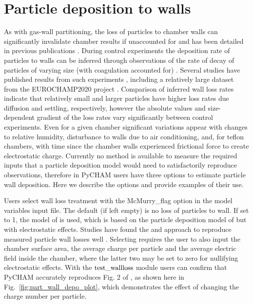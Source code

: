 \documentclass[gmd, manuscript]{copernicus}
\begin{document}
\section{Particle deposition to walls}

As with gas-wall partitioning, the loss of particles to chamber walls can significantly invalidate chamber results if unaccounted for and has been detailed in previous publications \citep{McMurry1985, Nah2017, Wang2018}.  During control experiments the deposition rate of particles to walls can be inferred through observations of the rate of decay of particles of varying size (with coagulation accounted for) \citep{Charan2019}.  Several studies have published results from such experiments \citep{McMurry1985, Wang2018}, including a relatively large dataset from the EUROCHAMP2020 project \citep{EUROCHAMP2020}.  Comparison of inferred wall loss rates indicate that relatively small and larger particles have higher loss rates due diffusion and settling, respectively, however the absolute values and size-dependent gradient of the loss rates vary significantly between control experiments.  Even for a given chamber significant variations appear with changes to relative humidity, disturbance to walls due to air conditioning, and, for teflon chambers, with time since the chamber walls experienced frictional force to create electrostatic charge.  Currently no method is available to measure the required inputs that a particle deposition model would need to satisfactorily reproduce observations, therefore in PyCHAM users have three options to estimate particle wall deposition.  Here we describe the options and provide examples of their use.

Users select wall loss treatment with the McMurry\_flag option in the model variables input file.  The default (if left empty) is no loss of particles to wall.  If set to 1, the model of \citet{McMurry1985} is used, which is based on the particle deposition model of \citet{Crump1981} but with electrostatic effects.  Studies have found the \citet{Crump1981} and \citet{McMurry1985} approach to reproduce measured particle wall losses well \citep{Chen1992, Kim2001}.  Selecting \citet{McMurry1985} requires the user to also input the chamber surface area, the average charge per particle and the average electric field inside the chamber, where the latter two may be set to zero for nullifying electrostatic effects.  With the $\rm{test\_wallloss}$ module users can confirm that PyCHAM accurately reproduces Fig. 2 of \citet{McMurry1985}, as shown here in Fig.~\ref{fig:part_wall_depo_plot}, which demonstrates the effect of changing the charge number per particle.
\end{document}
